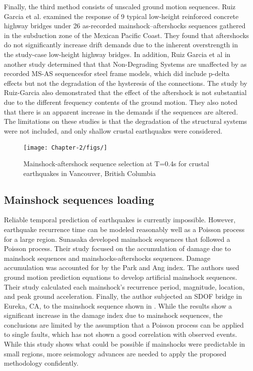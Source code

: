 Finally, the third method consists of unscaled ground motion sequences. Ruiz Garcia et al. \cite{Ruiz-Garcia2008} examined the response of 9 typical low-height reinforced concrete highway bridges under 26 as-recorded mainshock–aftershocks sequences gathered in the subduction zone of the Mexican Pacific Coast. They found that aftershocks do not significantly increase drift demands due to the inherent overstrength in the study-case low-height highway bridges\cite{Ruiz-Garcia2008}. In addition, Ruiz Garcia et al \citep{Ruiz-Garcia2011} in another study determined that that Non-Degrading Systems are unaffected by as recorded MS-AS sequencesfor steel frame models, which did include p-delta effects but not the degradation of the hysteresis of the connections. The study by Ruiz-Garcia also demonstrated that the effect of the aftershock is not substantial due to the different frequency contents of the ground motion. They also noted that there is an apparent increase in the demands if the sequences are altered. The limitations on these studies is that the degradation of the structural systems were not included, and only shallow crustal earthquakes were considered.

\begin{figure}[htbp]
\centering
\texttt{[image: Chapter-2/figs/]}
\caption{Mainshock-aftershock sequence selection at T=0.4s for crustal earthquakes in Vancouver, British Columbia \cite{Tesfamariam2015}}
\label{fig:MS-AS_Goda}
\end{figure}

\subsection{Mainshock sequences loading}

Reliable temporal prediction of earthquakes is currently impossible. However, earthquake recurrence time can be modeled reasonably well as a Poisson process for a large region. Sunasaka \cite{Sunasaka1993} developed mainshock sequences that followed a Poisson process. Their study focused on the accumulation of damage due to mainshock sequences and mainshocks-aftershocks sequences. Damage accumulation was accounted for by the Park and Ang index. The authors used ground motion prediction equations to develop artificial mainshock sequences. Their study calculated each mainshock's recurrence period, magnitude, location, and peak ground acceleration. Finally, the author subjected an SDOF bridge in Eureka, CA, to the mainshock sequence shown in   . While the results show a significant increase in the damage index due to mainshock sequences, the conclusions are limited by the assumption that a Poisson process can be applied to single faults, which has not shown a good correlation with observed events\cite{Shearer2009}. While this study shows what could be possible if mainshocks were predictable in small regions, more seismology advances are needed to apply the proposed methodology confidently.

